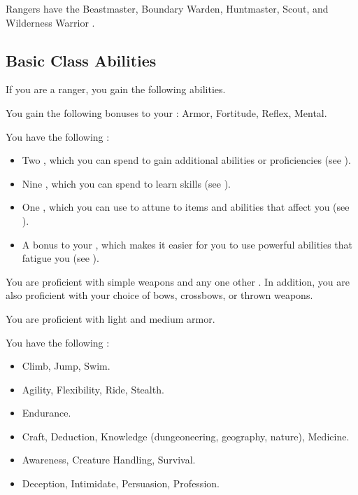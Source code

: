      Rangers have the Beastmaster, Boundary Warden, Huntmaster, Scout, and Wilderness Warrior .

    \subsection{Basic Class Abilities}
        If you are a ranger, you gain the following abilities.

        You gain the following bonuses to your :  Armor,  Fortitude,  Reflex,  Mental.

         You have the following :
        \begin{itemize}
            \item Two , which you can spend to gain additional abilities or proficiencies (see ).
            \item Nine , which you can spend to learn skills (see ).
            \item One , which you can use to attune to items and abilities that affect you (see ).
            \item A  bonus to your , which makes it easier for you to use powerful abilities that fatigue you (see ).
        \end{itemize}

        You are proficient with simple weapons and any one other .
        In addition, you are also proficient with your choice of bows, crossbows, or thrown weapons.

        You are proficient with light and medium armor.

        You have the following :
        \begin{itemize}
            \item {} Climb, Jump, Swim.
            \item {} Agility, Flexibility, Ride, Stealth.
            \item {} Endurance.
            \item {} Craft, Deduction, Knowledge (dungeoneering, geography, nature), Medicine.
            \item {} Awareness, Creature Handling, Survival.
            \item {} Deception, Intimidate, Persuasion, Profession.
        \end{itemize}

